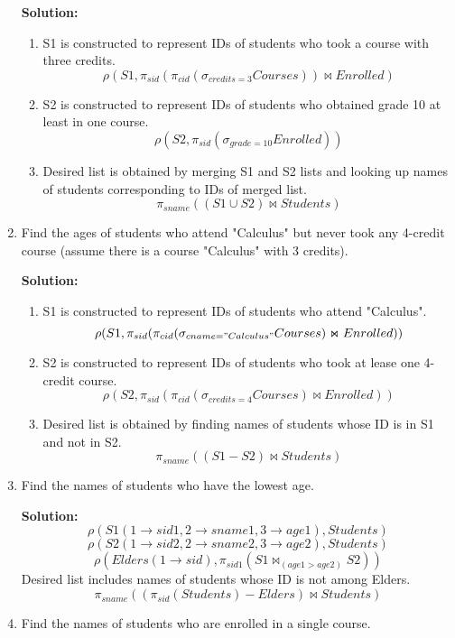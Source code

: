 \begin{enumerate}
  \textbf{Solution:}
  \begin{enumerate}
  \item S1 is constructed to represent IDs of students who took a course with three credits.
  $$\displaystyle \rho(S1, \pi_{sid} (\pi_{cid} (\sigma_{credits=3}Courses) ) \Join Enrolled)$$
  \item S2 is constructed to represent IDs of students who obtained grade 10 at least in one course.
  $$\displaystyle \rho(S2, \pi_{sid}(\sigma_{grade=10}Enrolled) ) $$
  \item Desired list is obtained by merging S1 and S2 lists and looking up names of students corresponding to IDs of merged list.
  $$\displaystyle \pi_{sname}((S1 \cup S2) \Join Students) $$
  \end{enumerate}

  \item Find the ages of students who attend "Calculus" but never took any 4-credit course (assume there is a course "Calculus" with 3 credits).

  \textbf{Solution:}
  \begin{enumerate}
  \item S1 is constructed to represent IDs of students who attend "Calculus".
  $$ \displaystyle \rho(S1,   \pi_{sid}( \pi_{cid}( \sigma_{cname="Calculus"}Courses) \Join Enrolled) ) $$
  \item S2 is constructed to represent IDs of students who took at lease one 4-credit course.
  $$ \displaystyle \rho(S2, \pi_{sid} (\pi_{cid}( \sigma_{credits=4}Courses) \Join Enrolled) ) $$
  \item Desired list is obtained by finding names of students whose ID is in S1 and not in S2.
  $$ \displaystyle \pi_{sname}((S1-S2)\Join Students) $$
  \end{enumerate}

  \item Find the names of students who have the lowest age.

  \textbf{Solution:}
  $$\displaystyle \rho(S1(1\rightarrow sid1, 2\rightarrow sname1, 3\rightarrow age1),Students)$$
  $$\rho(S2(1\rightarrow sid2, 2\rightarrow sname2, 3\rightarrow age2),Students)$$
  $$\rho(Elders(1\rightarrow sid),\pi_{sid1}(S1 \Join_{(age1>age2)} S2)) $$
  Desired list includes names of students whose ID is not among Elders.
  $$ \pi_{sname}((\pi_{sid}(Students)-Elders) \Join Students) $$

  \item Find the names of students who are enrolled in a single course.


\end{enumerate}
